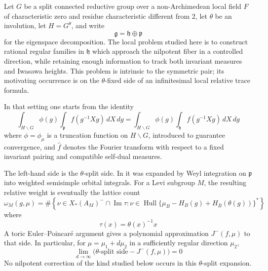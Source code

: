 \documentclass[11pt]{amsart}
\theoremstyle{definition}
\theoremstyle{remark}
\newcommand{\g}{\mathfrak g}
\newcommand{\h}{\mathfrak h}
\newcommand{\p}{\mathfrak p}
\begin{document}
Let $G$ be a split connected reductive group over a non-Archimedean local
field $F$ of characteristic zero and residue characteristic different from
$2$, let $\theta$ be an involution, let $H=G^\theta$, and write
\[
 \g=\h\oplus\p
\]
for the eigenspace decomposition.  The local problem studied here is to
construct rational regular families in $\h$ which approach the nilpotent
fiber in a controlled direction, while retaining enough information to track
both invariant measures and Iwasawa heights.  This problem is intrinsic to
the symmetric pair; its motivating occurrence is on the $\theta$-fixed side of
an infinitesimal local relative trace formula.

In that setting one starts from the identity
\begin{equation}\label{eq:intro-plancherel}
 \int_{H\backslash G}\phi(g)
     \int_{\p} f(g^{-1}Xg)\,dX\,dg
 =
 \int_{H\backslash G}\phi(g)
     \int_{\h}\widehat f(g^{-1}Xg)\,dX\,dg
\end{equation}
where $\phi=\phi_\mu$ is a truncation function on $H\backslash G$, introduced to
guarantee convergence, and $\widehat f$ denotes the Fourier transform with
respect to a fixed invariant pairing and compatible self-dual measures.

The left-hand side is the $\theta$-split side.  In
\cite{SparlingThetaSplit} it was expanded by Weyl integration on $\p$ into
weighted semisimple orbital integrals.  For a Levi subgroup $M$, the resulting
relative weight is eventually the lattice count
\begin{equation}\label{eq:theta-split-weight}
 \omega_M(g,\mu)
 =\#\left\{\nu\in X_*(A_M)^-\cap\operatorname{Im}\tau:
 \nu\in
 \operatorname{Hull}
 \{\mu_B-H_B(g)+H_{\bar B}(\theta(g))\}^{*}\right\}
\end{equation}
where
\[
 \tau(x)=\theta(x)^{-1}x
\]
A toric Euler--Poincar\'e argument gives a polynomial approximation
$J^-(f,\mu)$ to that side.  In particular, for
$\mu=\mu_1+d\mu_2$ in a sufficiently regular direction $\mu_2$,
\begin{equation}\label{eq:theta-split-limit}
 \lim_{d\to\infty}
 \bigl(\text{$\theta$-split side}-J^-(f,\mu)\bigr)=0
\end{equation}
No nilpotent correction of the kind studied below occurs in this
$\theta$-split expansion.
\end{document}
